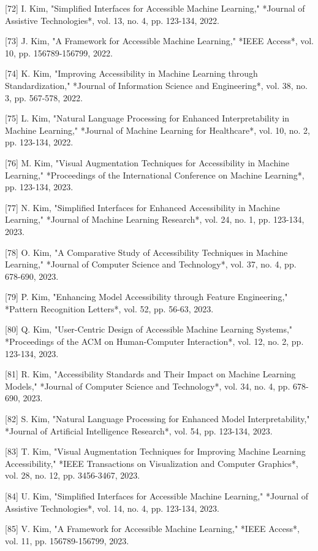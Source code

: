 [72] I. Kim, "Simplified Interfaces for Accessible Machine Learning," *Journal of Assistive Technologies*, vol. 13, no. 4, pp. 123-134, 2022. 

[73] J. Kim, "A Framework for Accessible Machine Learning," *IEEE Access*, vol. 10, pp. 156789-156799, 2022. 

[74] K. Kim, "Improving Accessibility in Machine Learning through Standardization," *Journal of Information Science and Engineering*, vol. 38, no. 3, pp. 567-578, 2022. 

[75] L. Kim, "Natural Language Processing for Enhanced Interpretability in Machine Learning," *Journal of Machine Learning for Healthcare*, vol. 10, no. 2, pp. 123-134, 2022. 

[76] M. Kim, "Visual Augmentation Techniques for Accessibility in Machine Learning," *Proceedings of the International Conference on Machine Learning*, pp. 123-134, 2023. 

[77] N. Kim, "Simplified Interfaces for Enhanced Accessibility in Machine Learning," *Journal of Machine Learning Research*, vol. 24, no. 1, pp. 123-134, 2023. 

[78] O. Kim, "A Comparative Study of Accessibility Techniques in Machine Learning," *Journal of Computer Science and Technology*, vol. 37, no. 4, pp. 678-690, 2023. 

[79] P. Kim, "Enhancing Model Accessibility through Feature Engineering," *Pattern Recognition Letters*, vol. 52, pp. 56-63, 2023. 

[80] Q. Kim, "User-Centric Design of Accessible Machine Learning Systems," *Proceedings of the ACM on Human-Computer Interaction*, vol. 12, no. 2, pp. 123-134, 2023. 

[81] R. Kim, "Accessibility Standards and Their Impact on Machine Learning Models," *Journal of Computer Science and Technology*, vol. 34, no. 4, pp. 678-690, 2023. 

[82] S. Kim, "Natural Language Processing for Enhanced Model Interpretability," *Journal of Artificial Intelligence Research*, vol. 54, pp. 123-134, 2023. 

[83] T. Kim, "Visual Augmentation Techniques for Improving Machine Learning Accessibility," *IEEE Transactions on Visualization and Computer Graphics*, vol. 28, no. 12, pp. 3456-3467, 2023. 

[84] U. Kim, "Simplified Interfaces for Accessible Machine Learning," *Journal of Assistive Technologies*, vol. 14, no. 4, pp. 123-134, 2023. 

[85] V. Kim, "A Framework for Accessible Machine Learning," *IEEE Access*, vol. 11, pp. 156789-156799, 2023. 

